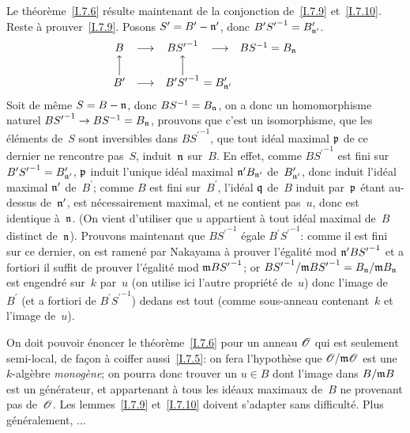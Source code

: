 Le
th\'eor\`eme~\ref{I.7.6} r\'esulte maintenant de la conjonction
de~\ref{I.7.9} et~\ref{I.7.10}. Reste \`a
prouver~\ref{I.7.9}. Posons $S^\prime = B^\prime - \mathfrak{n}^\prime$,
donc $B^\prime {S^\prime}^{-1} = B^\prime_{\mathfrak{n}^\prime}$.
$$
\begin{array}{ccccc}
B&\longrightarrow&B{S^\prime}^{-1}&\longrightarrow&BS^{-1} =
B_\goth{n}\\ \Big\uparrow&&\Big\uparrow&&\\
B^\prime&\longrightarrow&B^\prime{S^\prime}^{-1}
\rlap{\hbox{$\displaystyle \ = B^\prime_{\goth{n}^\prime}$}}&&
\end{array}
$$
Soit de m\^eme $S=B-\mathfrak{n}$, donc $BS^{-1} = B_\mathfrak{n}$, on a
donc un homomorphisme naturel $B{S^\prime}^{-1} \to BS^{-1} =
B_\goth{n}$, prouvons que c'est un isomorphisme, \ie que les
\'el\'ements de~$S$ sont inversibles dans $B{S^\prime}^{-1}$,
\ie que tout id\'eal maximal $\mathfrak{p}$ de ce dernier ne rencontre
pas~$S$, \ie induit~$\mathfrak{n}$ sur~$B$. En effet, comme
$B{S^\prime}^{-1}$ est fini sur~$B^\prime{S^\prime}^{-1} =
B^\prime_{\mathfrak{n}^\prime}$, $\mathfrak{p}$ induit l'unique id\'eal
maximal $\mathfrak{n}^\prime B_{\mathfrak{n}^\prime}$
de~$B^\prime_{\mathfrak{n}^\prime}$, donc induit l'id\'eal maximal
$\mathfrak{n}^\prime$ de~$B^\prime$; comme $B$ est fini sur~$B^\prime$,
l'id\'eal $\mathfrak{q}$ de~$B$ induit par~$\mathfrak{p}$ \'etant
au-dessus de~$\mathfrak{n}^\prime$, est n\'ecessairement maximal, et ne
contient pas~$u$, donc est identique \`a~$\mathfrak{n}$. (On vient
d'utiliser que $u$ appartient \`a tout id\'eal maximal de~$B$
distinct de~$\mathfrak{n}$). Prouvons maintenant que $B{S^\prime}^{-1}$
\'egale $B^\prime{S^\prime}^{-1}$: comme il est fini sur ce dernier,
on est ramen\'e par Nakayama \`a prouver l'\'egalit\'e mod
$\mathfrak{n}^\prime B {S^\prime}^{-1}$ et a fortiori il suffit de prouver
l'\'egalit\'e mod $\mathfrak{m} B{S^\prime}^{-1}$; or
$B{S^\prime}^{-1}/\mathfrak{m} B{S^\prime}^{-1} = B_\mathfrak{n}/\mathfrak{m}
B_\mathfrak{n}$ est engendr\'e sur~$k$ par~$u$ (on utilise ici l'autre
propri\'et\'e de~$u$) donc l'image de~$B^\prime$ (et a fortiori de
$B^\prime {S^\prime}^{-1}$) dedans est tout (comme sous-anneau
contenant~$k$ et l'image de~$u$).

\begin{remarquestar}
On doit pouvoir \'enoncer le th\'eor\`eme~\ref{I.7.6} pour un
anneau $\cal{O}$ qui est seulement semi-local, de fa\c con \`a
coiffer aussi~\ref{I.7.5}: on fera l'hypoth\`ese que
$\cal{O}/\goth{m}\cal{O}$ est une $k$-alg\`ebre \emph{monogène};
on pourra donc trouver un $u\in B$ dont l'image dans
$B/\mathfrak{m}B$
est un g\'en\'erateur, et appartenant \`a tous les id\'eaux
maximaux de~$B$ ne provenant pas de~$\cal{O}$. Les lemmes~\ref{I.7.9}
et~\ref{I.7.10} doivent s'adapter sans difficult\'e. Plus
g\'en\'eralement, ...
\end{remarquestar}

